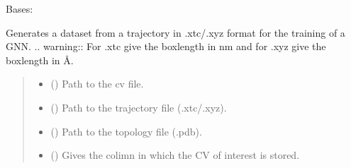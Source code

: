 \documentclass[a4paper,10pt,english]{report}
\begin{document}

\begin{fulllineitems}
\label{\detokenize{NNucleate:NNucleate.dataset.GNNTrajectory}}
\pysigstartsignatures
{}
\pysigstopsignatures
\sphinxAtStartPar
Bases: 

\sphinxAtStartPar
Generates a dataset from a trajectory in .xtc/.xyz format for the training of a GNN. 
.. warning:: For .xtc give the boxlength in nm and for .xyz give the boxlength in Å.
\begin{quote}\begin{description}
\begin{itemize}
\item {} 
\sphinxAtStartPar
{} () \textendash{} Path to the cv file.

\item {} 
\sphinxAtStartPar
{} () \textendash{} Path to the trajectory file (.xtc/.xyz).

\item {} 
\sphinxAtStartPar
{} () \textendash{} Path to the topology file (.pdb).

\item {} 
\sphinxAtStartPar
{} () \textendash{} Gives the colimn in which the CV of interest is stored.


\end{itemize}
\end{description}
\end{quote}
\end{fulllineitems}
\end{document}
